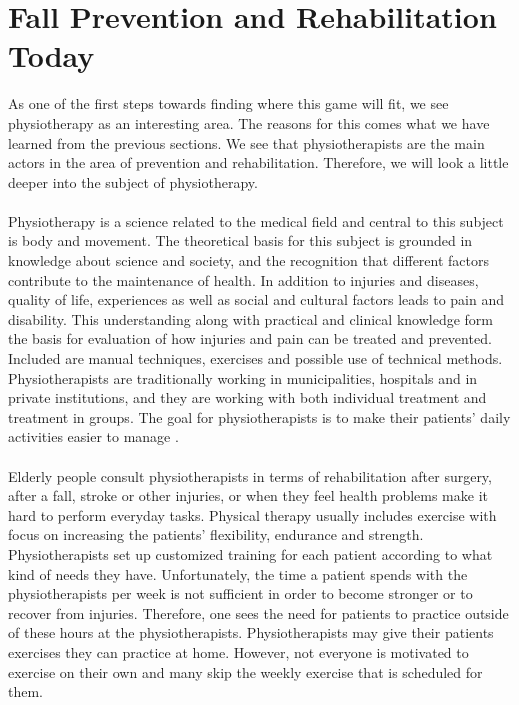 \section{Fall Prevention and Rehabilitation Today}
As one of the first steps towards finding where this game will fit, we see physiotherapy as an interesting area. The reasons for this comes what we have learned from the previous sections. We see that physiotherapists are the main actors in the area of prevention and rehabilitation. Therefore, we will look a little deeper into the subject of physiotherapy. \\ \\
Physiotherapy is a science related to the medical field and central to this subject is body and movement. The theoretical basis for this subject is grounded in knowledge about science and society, and the recognition that different factors contribute to the maintenance of health. In addition to injuries and diseases, quality of life, experiences as well as social and cultural factors leads to pain and disability. This understanding along with practical and clinical knowledge form the basis for evaluation of how injuries and pain can be treated and prevented. Included are manual techniques, exercises and possible use of technical methods. Physiotherapists are traditionally working in municipalities, hospitals and in private institutions, and they are working with both individual treatment and treatment in groups. The goal for physiotherapists is to make their patients' daily activities easier to manage \cite{physiotherapy1}\cite{physiotherapy2}.\\ \\
Elderly people consult physiotherapists in terms of rehabilitation after surgery, after a fall, stroke or other injuries, or when they feel health problems make it hard to perform everyday tasks. Physical therapy usually includes exercise with focus on increasing the patients’ flexibility, endurance and strength. Physiotherapists set up customized training for each patient according to what kind of needs they have. Unfortunately, the time a patient spends with the physiotherapists per week is not sufficient in order to become stronger or to recover from injuries. Therefore, one sees the need for patients to practice outside of these hours at the physiotherapists. Physiotherapists may give their patients exercises they can practice at home. However, not everyone is motivated to exercise on their own and many skip the weekly exercise that is scheduled for them. \cite{physiotherapy2} 


